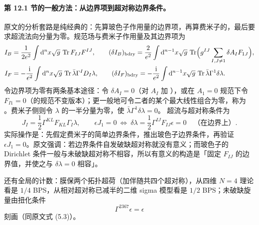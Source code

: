 \paragraph{第 12.1 节的一般方法：从边界项到超对称边界条件。}原文的分析套路是纯经典的：先算玻色子作用量的边界项，再算费米子的，最后要求超流法向分量为零。规范场与费米子作用量及其边界项为
\begin{align}
I_B&=\frac{1}{2e^2}\int\mathrm{d}^n x\sqrt g\,\operatorname{Tr} F_{IJ}F^{IJ},\qquad
(\delta I_B)_{\mathrm{bdry}}=\frac{2}{e^2}\int\mathrm{d}^{n-1}x\sqrt g\,\operatorname{Tr}\Bigl(g^{IJ}\sum_{I,J\neq1}\delta A_I F_{1J}\Bigr),\label{eq:IB}\\
I_F&=-\frac{\mathrm{i}}{e^2}\int\mathrm{d}^n x\sqrt g\,\operatorname{Tr}\bar\lambda\Gamma^I D_I\lambda,\qquad
(\delta I_F)_{\mathrm{bdry}}=-\frac{\mathrm{i}}{e^2}\int\mathrm{d}^{n-1}x\sqrt g\,\operatorname{Tr}\bar\lambda\Gamma^1\delta\lambda .\label{eq:IF}
\end{align}
\pA{} 令边界项为零有两条基本途径：令 \(\delta A_I=0\)（对 \(A_I\) 加 ），或在 \(A_1=0\) 规范下令 \(F_{I1}=0\)（的规范不变版本）；更一般地可令二者的某个最大线性组合为零，称为 。费米子侧则令 \(\lambda\) 的一半分量为零，使 \(\bar\lambda\Gamma^1\delta\lambda=0\)。\pA{} 超流与超对称条件为
\begin{equation}
J_I=\frac12\Gamma^{KL}F_{KL}\Gamma_I\lambda,\qquad
\epsilon J_1=0
\ \Longleftrightarrow\
\delta\lambda=\frac12\Gamma^{IJ}F_{IJ}\epsilon=0
\quad\text{（在边界上）}.
\label{eq:supercurrent}
\end{equation}
\pA{} 实际操作是：先假定费米子的简单边界条件，推出玻色子边界条件，再验证 \(\epsilon J_1=0\)。原文强调：若边界条件自发破缺超对称就没有意义；而玻色子的 Dirichlet 条件一般与未破缺超对称不相容，所以有意义的构造是「固定 \(F_{IJ}\) 的边界值，并使之与 \(\delta\lambda=0\) 相容」。\pA{}

还有全局的计数：膜保两个拓扑超荷（加伴随共四个超对称），从四维 \(N=4\) 理论看是 \(1/4\) BPS，从相对超对称已减半的二维 sigma 模型看是 \(1/2\) BPS；未破缺旋量由扭化条件
\begin{equation}
\Gamma^{2367}\epsilon=\epsilon
\label{eq:chirality}
\end{equation}
刻画（同原文式 (5.3)）。\pA{}

